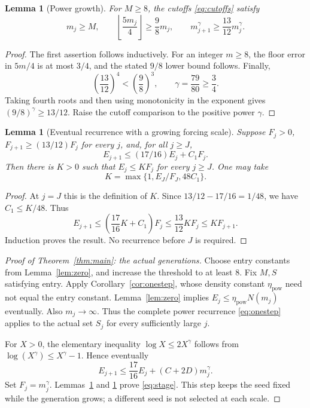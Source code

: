\documentclass[11pt]{article}
\newtheorem{lemma}[theorem]{Lemma}
\theoremstyle{definition}
\theoremstyle{remark}
\begin{document}
\begin{lemma}[Power growth]\label{lem:powergrowth}
For \(M\ge8\), the cutoffs \eqref{eq:cutoffs} satisfy
\[
 m_j\ge M,\qquad
 \left\lfloor\frac{5m_j}{4}\right\rfloor\ge\frac98m_j,\qquad
 m_{j+1}^{\gamma}\ge\frac{13}{12}m_j^\gamma.
\]
\end{lemma}
\begin{proof}
The first assertion follows inductively. For an integer \(m\ge8\),
the floor error in \(5m/4\) is at most \(3/4\), and the stated
\(9/8\) lower bound follows. Finally,
\[
 \left(\frac{13}{12}\right)^4<
 \left(\frac98\right)^3,\qquad
 \gamma=\frac{79}{80}\ge\frac34.
\]
Taking fourth roots and then using monotonicity in the exponent gives
\((9/8)^\gamma\ge13/12\). Raise the cutoff comparison to
the positive power \(\gamma\).
\end{proof}

\begin{lemma}[Eventual recurrence with a growing forcing scale]
\label{lem:abstract}
Suppose \(F_j>0\), \(F_{j+1}\ge(13/12)F_j\) for every \(j\), and,
for all \(j\ge J\),
\[
 E_{j+1}\le(17/16)E_j+C_1F_j.
\]
Then there is \(K>0\) such that \(E_j\le KF_j\) for every \(j\ge J\).
One may take
\[
 K=\max\{1,E_J/F_J,48C_1\}.
\]
\end{lemma}
\begin{proof}
At \(j=J\) this is the definition of \(K\). Since
\(13/12-17/16=1/48\), we have \(C_1\le K/48\). Thus
\[
 E_{j+1}\le\left(\frac{17}{16}K+C_1\right)F_j
 \le\frac{13}{12}KF_j\le KF_{j+1}.
\]
Induction proves the result. No recurrence before \(J\) is required.
\end{proof}

\begin{proof}[Proof of Theorem~\ref{thm:main}: the actual generations]
Choose entry constants from Lemma~\ref{lem:zero}, and increase the
threshold to at least \(8\). Fix \(M,S\) satisfying entry.
Apply Corollary~\ref{cor:onestep}, whose density constant
\(\eta_{\mathrm{pow}}\) need not equal the entry constant.
Lemma~\ref{lem:zero} implies \(E_j\le\eta_{\mathrm{pow}}N(m_j)\)
eventually. Also \(m_j\to\infty\). Thus the complete power recurrence
\eqref{eq:onestep} applies to the actual set \(S_j\) for every
sufficiently large \(j\).

For \(X>0\), the elementary inequality \(\log X\le2X^\gamma\)
follows from \(\log(X^\gamma)\le X^\gamma-1\).
Hence eventually
\[
 E_{j+1}\le\frac{17}{16}E_j+(C+2D)m_j^\gamma.
\]
Set \(F_j=m_j^\gamma\). Lemmas~\ref{lem:powergrowth}
and \ref{lem:abstract} prove \eqref{eq:stage}.
This step keeps the seed fixed while the generation grows; a different
seed is not selected at each scale.
\end{proof}
\end{document}
